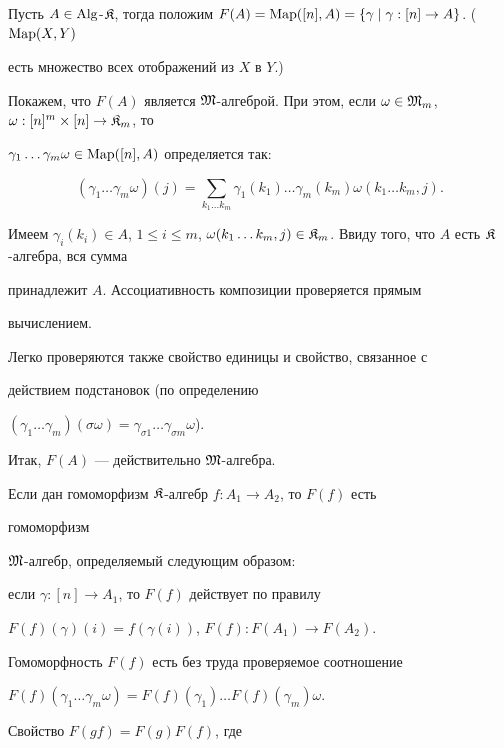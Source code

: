 \begin{pf}


Пусть $A\in \Alg$-$\frak K$, тогда положим $F(A)=\Map([n],A)=


\{\gamma\mid\gamma:[n]\to A\}$. ($\Map(X,Y)$


есть множество всех отображений из $X$ в $Y$.)


Покажем, что $F(A)$ является $\frak M$-алгеброй. При этом, если $\omega\in


\frak M_m$, $\omega:[n]^m\times [n]\to\frak K_m$, то


$\gamma_1\dotsc\gamma_m\omega \in\operatorname{Map}([n],A)$ определяется так:


$$


(\gamma_1\dotsc\gamma_m\omega)(j)=\sum_{k_1 \dotsc k_m}


\gamma_1(k_1)\dotsc\gamma_m(k_m)\omega (k_1\dotsc k_m,j).


$$


Имеем $\gamma_i(k_i)\in A$, $1\le i\le m$, $\omega (k_1\dotsc k_m,j)


\in\frak K_m$. Ввиду того, что $A$ есть $\frak K$-алгебра, вся сумма


принадлежит $A$. Ассоциативность композиции проверяется прямым


вычислением.


Легко проверяются также свойство единицы и свойство, связанное с


действием подстановок (по определению


$(\gamma_1\dotsc \gamma_m)(\sigma\omega)=


\gamma_{\sigma 1}\dotsc \gamma_{\sigma m}\omega $).


Итак, $F(A)$ --- действительно $\frak M$-ал\-ге\-бра.


Если дан гомоморфизм $\frak K$-алгебр $f:A_1 \to A_2$, то $F(f)$ есть


гомоморфизм


$\frak M$-ал\-гебр, определяемый следующим образом:


если $\gamma:[n]\longrightarrow A_1$, то $F(f)$ действует по правилу


$F(f)(\gamma)(i)=f(\gamma(i))$, $F(f):F(A_1)\longrightarrow F(A_2)$.


Гомоморфность $F(f)$ есть без труда проверяемое соотношение


$F(f)(\gamma_1\dotsc \gamma_m\omega)=F(f)(\gamma_1)\dotsc


F(f)(\gamma_m)\omega$.


Свойство $F(gf)=F(g)F(f)$, где



\end{pf}
